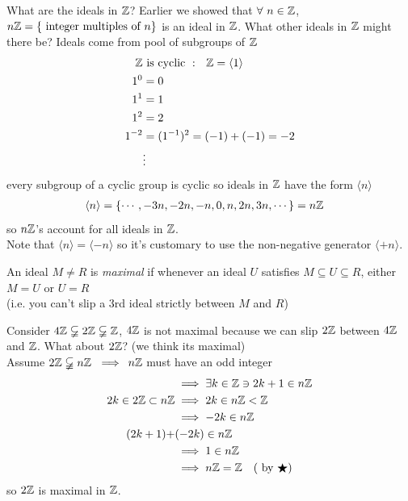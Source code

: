 \begin{example}
    What are the ideals in ${\mathbb{Z}}$? Earlier we showed that $\forall \ n\in {\mathbb{Z}}$,
    $n{\mathbb{Z}}=\{ \text{ integer multiples of }n\}$ is an ideal in ${\mathbb{Z}}$. What other ideals in ${\mathbb{Z}}$ might
    there be? Ideals come from pool of subgroups of ${\mathbb{Z}}$
    \begin{align}
        {\mathbb{Z}} &\text{ is cyclic }: \ \ {\mathbb{Z}}=\langle 1 \rangle \nonumber \\
        1^0&=0 \nonumber \\
        1^1&=1 \nonumber \\
        1^2&=2 \nonumber \\
        1^{-2}&= (1^{-1})^2 = (-1)+(-1)=-2 \nonumber \\
        &\vdots \nonumber
    \end{align}
    every subgroup of a cyclic group is cyclic so ideals in ${\mathbb{Z}}$ have the form $\langle n \rangle$
    \begin{align}
        \langle n \rangle &= \{\cdots, -3n, -2n, -n, 0, n, 2n, 3n, \cdots\} = n{\mathbb{Z}} \nonumber
    \end{align}
    so $n{\mathbb{Z}}$'s account for all ideals in ${\mathbb{Z}}$. \\ \steezybreak
    Note that $\langle n \rangle = \langle -n \rangle$ so it's customary to use the non-negative
    generator $\langle +n \rangle$.
\end{example}
\begin{definition}
    An ideal $M\neq R$ is \textit{maximal} if whenever an ideal $U$ satisfies
    $M\subseteq U \subseteq R$, either $M=U$ or $U=R$ \\

    \noindent (i.e. you can't slip a 3rd ideal strictly between $M$ and $R$)
\end{definition}
\begin{example}
    Consider $4{\mathbb{Z}} \varsubsetneqq 2{\mathbb{Z}} \varsubsetneqq {\mathbb{Z}}$, $4{\mathbb{Z}}$ is not maximal because we can slip
    $2{\mathbb{Z}}$ between $4{\mathbb{Z}}$ and ${\mathbb{Z}}$. What about $2{\mathbb{Z}}$? (we think its maximal) \\ \steezybreak
    Assume $2\Z \varsubsetneqq n\Z \ \implies$ $n{\mathbb{Z}}$ must have an odd integer
    \begin{align}
        &\implies \exists k \in {\mathbb{Z}} \ni 2k+1 \in n{\mathbb{Z}} \nonumber \\
        2k \in 2{\mathbb{Z}} \subset n{\mathbb{Z}} &\implies 2k \in n{\mathbb{Z}} < {\mathbb{Z}} \nonumber \\
        &\implies -2k \in n{\mathbb{Z}} \nonumber \\
        (2k+1)+&(-2k) \in n{\mathbb{Z}}  \nonumber \\
        &\implies 1\in n{\mathbb{Z}} \nonumber \\
        &\implies n{\mathbb{Z}} = {\mathbb{Z}} \ \ \ (\text{ by }\bigstar) \nonumber
    \end{align}
    so $2{\mathbb{Z}}$ is maximal in ${\mathbb{Z}}$.
\end{example}
